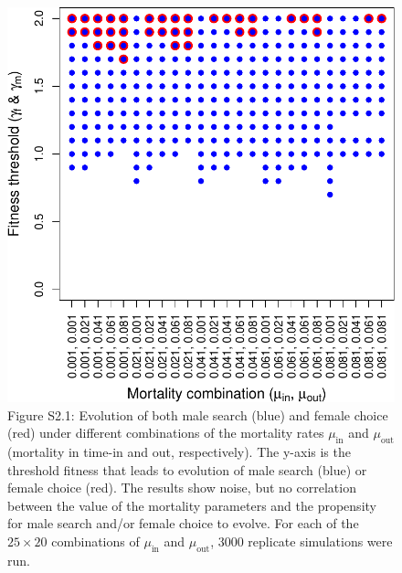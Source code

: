 \documentclass[
]{article}
\begin{document}
\begin{figure}
\centering
\includegraphics{SI_files/figure-latex/unnamed-chunk-2-1.pdf}
\caption{Figure S2.1: Evolution of both male search (blue) and female
choice (red) under different combinations of the mortality rates
\(\mu_{\mathrm{in}}\) and \(\mu_{\mathrm{out}}\) (mortality in time-in
and out, respectively). The y-axis is the threshold fitness that leads
to evolution of male search (blue) or female choice (red). The results
show noise, but no correlation between the value of the mortality
parameters and the propensity for male search and/or female choice to
evolve. For each of the \(25 \times 20\) combinations of
\(\mu_{\mathrm{in}}\) and \(\mu_{\mathrm{out}}\), 3000 replicate
simulations were run.}
\end{figure}

\captionsetup{labelformat=default}

\clearpage

\captionsetup{labelformat=empty}
\end{document}
